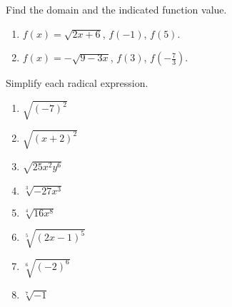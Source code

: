 \vfill
\begin{center} \hfill
{}
\end{center}


\begin{exercise}Find the domain and the indicated function value.
\begin{enumerate}[label={(\arabic*)~},itemsep=1in,itemindent=1ex]
\item $f(x)=\sqrt{2x+6}$, \quad $f(-1)$, \quad $f(5)$.
\item $f(x)=-\sqrt{9-3x}$, \quad $f(3)$, \quad $f(-\frac{7}{3})$.
\end{enumerate}
\end{exercise}


\vfill
\begin{center} \hfill
{}
\end{center}



\newpage


\begin{exercise}Simplify each radical expression.
\begin{enumerate}[label={(\arabic*)~}, itemsep=1in, itemindent=1ex]
\item $\sqrt{(-7)^2}$
\item $\sqrt{(x+2)^2}$
\item $\sqrt{25x^2y^6}$
\item $\sqrt[3]{-27x^3}$
\item $\sqrt[4]{16x^8}$
\item $\sqrt[5]{(2x-1)^5}$
\item $\sqrt[6]{(-2)^6}$
\item $\sqrt[7]{-1}$
\end{enumerate}
\end{exercise}


